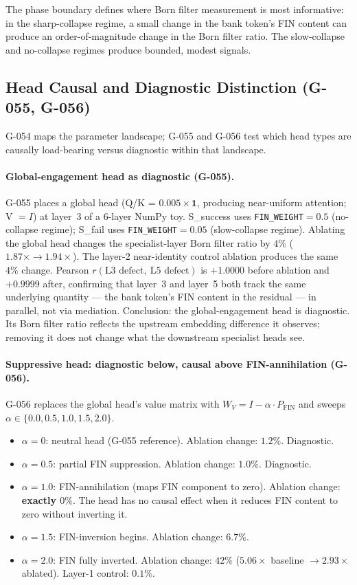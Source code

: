The phase boundary defines where Born filter measurement is most informative:
in the sharp-collapse regime, a small change in the bank token's FIN content can produce
an order-of-magnitude change in the Born filter ratio.
The slow-collapse and no-collapse regimes produce bounded, modest signals.

\subsection{Head Causal and Diagnostic Distinction (G-055, G-056)}

G-054 maps the parameter landscape; G-055 and G-056 test which head types are causally
load-bearing versus diagnostic within that landscape.

\paragraph{Global-engagement head as diagnostic (G-055).}
G-055 places a global head (Q/K = $0.005 \times \mathbf{1}$, producing near-uniform
attention; V $= I$) at layer~3 of a 6-layer NumPy toy.
S\_success uses \texttt{FIN\_WEIGHT}$=0.5$ (no-collapse regime); S\_fail uses
\texttt{FIN\_WEIGHT}$=0.05$ (slow-collapse regime).
Ablating the global head changes the specialist-layer Born filter ratio by $4\%$
($1.87\times \to 1.94\times$).
The layer-2 near-identity control ablation produces the same $4\%$ change.
Pearson $r(\text{L3 defect},\ \text{L5 defect})$ is $+1.0000$ before ablation and
$+0.9999$ after, confirming that layer~3 and layer~5 both track the same underlying
quantity --- the bank token's FIN content in the residual --- in parallel, not via
mediation.
Conclusion: the global-engagement head is diagnostic.
Its Born filter ratio reflects the upstream embedding difference it observes; removing it
does not change what the downstream specialist heads see.

\paragraph{Suppressive head: diagnostic below, causal above FIN-annihilation (G-056).}
G-056 replaces the global head's value matrix with
$W_V = I - \alpha \cdot P_\text{FIN}$ and sweeps $\alpha \in \{0.0, 0.5, 1.0, 1.5, 2.0\}$.

\begin{itemize}
  \item $\alpha=0$: neutral head (G-055 reference). Ablation change: $1.2\%$. Diagnostic.
  \item $\alpha=0.5$: partial FIN suppression. Ablation change: $1.0\%$. Diagnostic.
  \item $\alpha=1.0$: FIN-annihilation (maps FIN component to zero). Ablation change:
    \textbf{exactly $0\%$}. The head has no causal effect when it reduces FIN content
    to zero without inverting it.
  \item $\alpha=1.5$: FIN-inversion begins. Ablation change: $6.7\%$.
  \item $\alpha=2.0$: FIN fully inverted. Ablation change: \textbf{$42\%$}
    ($5.06\times$ baseline $\to 2.93\times$ ablated). Layer-1 control: $0.1\%$.
\end{itemize}

